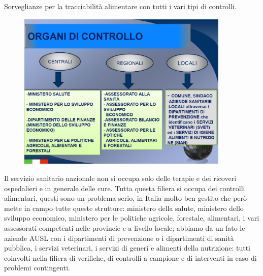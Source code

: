 Sorveglianze per la tracciabilità alimentare con tutti i vari tipi di
controlli.

\begin{figure}[!ht]
\centering
	\includegraphics[width=0.9\textwidth]{02/image14.png}
\end{figure}


Il servizio sanitario nazionale non si occupa solo delle terapie e dei
ricoveri ospedalieri e in generale delle cure. Tutta questa filiera si
occupa dei controlli alimentari, questi sono un problema serio, in
Italia molto ben gestito che però mette in campo tutte queste strutture:
ministero della salute, ministero dello sviluppo economico, ministero
per le politiche agricole, forestale, alimentari, i vari assessorati
competenti nelle provincie e a livello locale; abbiamo da un lato le
aziende AUSL con i dipartimenti di prevenzione o i dipartimenti di
sanità pubblica, i servizi veterinari, i servizi di generi e alimenti
della nutrizione: tutti coinvolti nella filiera di verifiche, di
controlli a campione e di interventi in caso di problemi contingenti.

